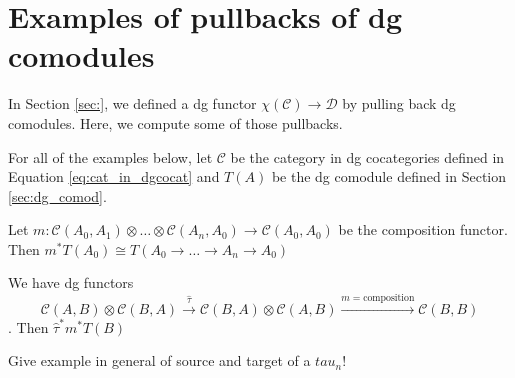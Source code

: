 \section{Examples of pullbacks of dg comodules}
In Section \ref{sec:}, we defined a dg functor
$\chi(\mathcal{C}) \to \mathcal{D}$ 
by pulling back dg comodules. Here, we compute 
some of those pullbacks.

For all of the examples below, let $\mathcal{C}$ 
be the category in dg cocategories defined in 
Equation \ref{eq:cat_in_dgcocat} and $T(A)$ be the 
dg comodule defined in Section \ref{sec:dg_comod}.

\begin{eg} Let $m:\mathcal{C}(A_0,A_1) \otimes \dots \otimes 
\mathcal{C}(A_n, A_0) \to \mathcal{C}(A_0,A_0)$ be the composition 
functor. Then $m^*T(A_0) \cong T(A_0 \to \dots \to A_n \to A_0)$
\end{eg}

\begin{eg} We have dg functors
$$\mathcal{C}(A,B) \otimes 
\mathcal{C}(B,A) 
\xrightarrow{\hat{\tau}}
\mathcal{C}(B,A) \otimes 
\mathcal{C}(A,B) 
\xrightarrow{m=\textrm{composition}}
 \mathcal{C}(B,B)$$. Then $\hat{\tau}^*m^*T(B)$
\end{eg}

Give example in general of source and target 
of a $tau_n!$